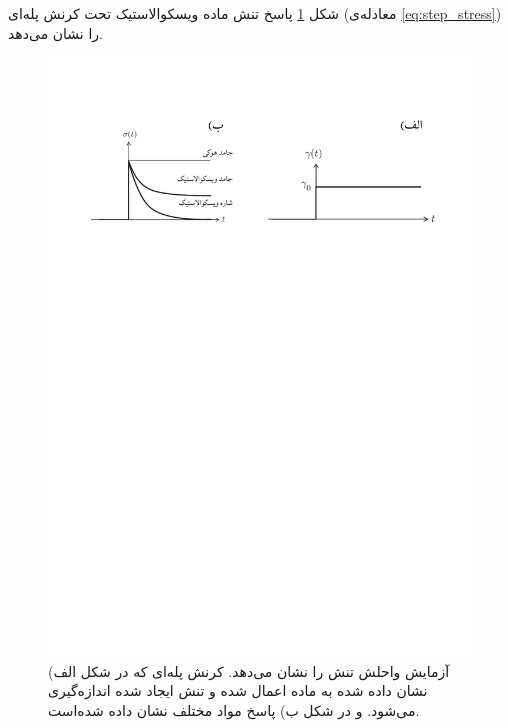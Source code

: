 شکل \ref{fig:relax} پاسخ تنش ماده ویسکوالاستیک تحت کرنش پله‌ای (معادله‌ی \ref{eq:step_stress}) را نشان می‌دهد.
\begin{figure}[htbp]
\begin{center}
\includegraphics[width=6in]{Figs/9_2}
\caption{
آزمایش واحلش تنش را نشان می‌دهد. کرنش پله‌ای که در شکل الف) نشان داده شده به ماده اعمال شده و تنش ایجاد شده اندازه‌گیری می‌شود. و در شکل ب) پاسخ مواد مختلف نشان داده ‌شده‌است.
}
\label{fig:relax}
\end{center}
\end{figure}

